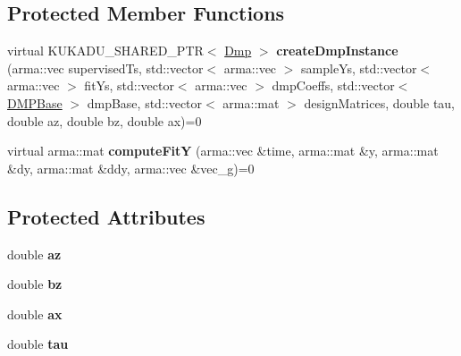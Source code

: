 \subsection*{Protected Member Functions}
\begin{DoxyCompactItemize}
\item 
\hypertarget{classkukadu_1_1GeneralDmpLearner_a817dca6e1bf76da6937e711300ee9226}{virtual K\-U\-K\-A\-D\-U\-\_\-\-S\-H\-A\-R\-E\-D\-\_\-\-P\-T\-R$<$ \hyperlink{classkukadu_1_1Dmp}{Dmp} $>$ {\bfseries create\-Dmp\-Instance} (arma\-::vec supervised\-Ts, std\-::vector$<$ arma\-::vec $>$ sample\-Ys, std\-::vector$<$ arma\-::vec $>$ fit\-Ys, std\-::vector$<$ arma\-::vec $>$ dmp\-Coeffs, std\-::vector$<$ \hyperlink{classkukadu_1_1DMPBase}{D\-M\-P\-Base} $>$ dmp\-Base, std\-::vector$<$ arma\-::mat $>$ design\-Matrices, double tau, double az, double bz, double ax)=0}\label{classkukadu_1_1GeneralDmpLearner_a817dca6e1bf76da6937e711300ee9226}

\item 
\hypertarget{classkukadu_1_1GeneralDmpLearner_a5df8ee4640adf585cbce7b04e77ae3a6}{virtual arma\-::mat {\bfseries compute\-Fit\-Y} (arma\-::vec \&time, arma\-::mat \&y, arma\-::mat \&dy, arma\-::mat \&ddy, arma\-::vec \&vec\-\_\-g)=0}\label{classkukadu_1_1GeneralDmpLearner_a5df8ee4640adf585cbce7b04e77ae3a6}

\end{DoxyCompactItemize}
\subsection*{Protected Attributes}
\begin{DoxyCompactItemize}
\item 
\hypertarget{classkukadu_1_1GeneralDmpLearner_abccf72154087561579ce0abe1ff85ff3}{double {\bfseries az}}\label{classkukadu_1_1GeneralDmpLearner_abccf72154087561579ce0abe1ff85ff3}

\item 
\hypertarget{classkukadu_1_1GeneralDmpLearner_ad910f3a86c8551f63c643347ae4f15fe}{double {\bfseries bz}}\label{classkukadu_1_1GeneralDmpLearner_ad910f3a86c8551f63c643347ae4f15fe}

\item 
\hypertarget{classkukadu_1_1GeneralDmpLearner_ab6b6b3fa49ef6c7925dbe34ea5991f48}{double {\bfseries ax}}\label{classkukadu_1_1GeneralDmpLearner_ab6b6b3fa49ef6c7925dbe34ea5991f48}

\item 
\hypertarget{classkukadu_1_1GeneralDmpLearner_af27b307365984e9deae829ca2159ed57}{double {\bfseries tau}}\label{classkukadu_1_1GeneralDmpLearner_af27b307365984e9deae829ca2159ed57}

\end{DoxyCompactItemize}


